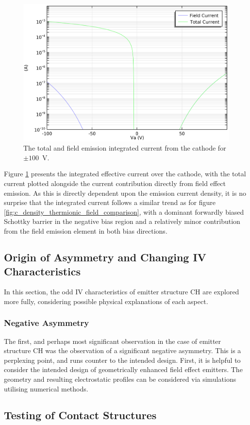\begin{refsection}
\begin{figure}[H]
    \centering
    \includegraphics[width=0.8\linewidth]{Chapter7/Figs/Raster/Comsol/current_thermionic_field_comparison.png}
    \caption{The total and field emission integrated current from the cathode for $\pm100$~\si{\volt}.}
    \label{fig:c_current_thermionic_field_comparison}
\end{figure}

Figure \ref{fig:c_current_thermionic_field_comparison} presents the integrated effective current over the cathode, with the total current plotted alongside the current contribution directly from field effect emission. As this is directly dependent upon the emission current density, it is no surprise that the integrated current follows a similar trend as for figure \ref{fig:c_density_thermionic_field_comparison}, with a dominant forwardly biased Schottky barrier in the negative bias region and a relatively minor contribution from the field emission element in both bias directions.

\subsection{Origin of Asymmetry and Changing IV Characteristics}
In this section, the odd IV characteristics of emitter structure CH are explored more fully, considering possible physical explanations of each aspect.
\subsubsection{Negative Asymmetry}
The first, and perhaps most significant observation in the case of emitter structure CH was the observation of a significant negative asymmetry. This is a perplexing point, and runs counter to the intended design. First, it is helpful to consider the intended design of geometrically enhanced field effect emitters. The geometry and resulting electrostatic profiles can be considered via simulations utilising numerical methods.

\subsection{Testing of Contact Structures}


\printbibliography[heading=subbibliography]

\end{refsection}